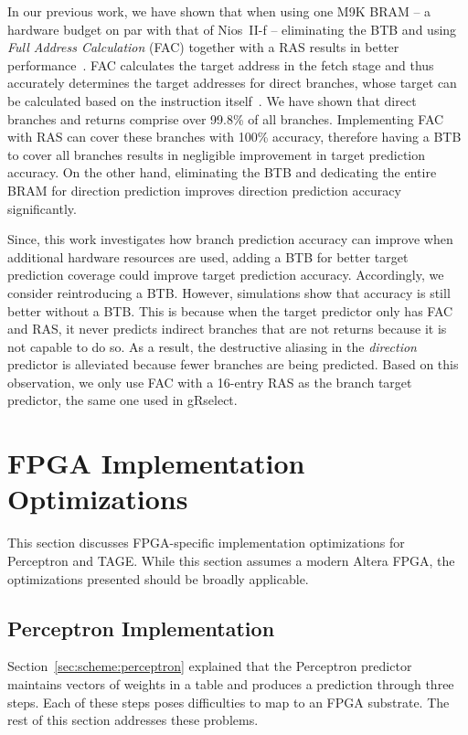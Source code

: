 \documentclass[conference]{IEEEtran}
\begin{document}
In our previous work, we have shown that when using one M9K BRAM -- a hardware budget on par with that of \mbox{Nios~II-f} -- eliminating the BTB and using \textit{Full Address Calculation} (FAC) together with a RAS results in better performance~\cite{grselect}. FAC calculates the target address in the fetch stage and thus accurately determines the target addresses for direct branches, whose target can be calculated based on the instruction itself~\cite{niosii}. We have shown that direct branches and returns comprise over 99.8\% of all branches. Implementing FAC with RAS can cover these branches with 100\% accuracy, therefore having a BTB to cover all branches results in negligible improvement in target prediction accuracy. On the other hand, eliminating the BTB and dedicating the entire BRAM for direction prediction improves direction prediction accuracy significantly.

Since, this work investigates how branch prediction accuracy can improve when additional hardware resources are used,  adding a BTB for better target prediction coverage could improve target prediction accuracy. Accordingly, we consider reintroducing a BTB. However, simulations show that accuracy is still better without a BTB. This is because when the target predictor only has FAC and RAS, it never predicts indirect branches that are not returns because it is not capable to do so. As a result, the destructive aliasing in the \textit{direction} predictor is alleviated because fewer branches are being predicted. Based on this observation, we only use FAC with a 16-entry RAS as the branch target predictor, the same one used in gRselect.


\section{FPGA Implementation Optimizations}
\label{sec:fpga}
This section discusses FPGA-specific implementation optimizations for Perceptron and TAGE. While this section assumes a modern Altera FPGA, the optimizations presented should be broadly applicable.

\subsection{Perceptron Implementation}
\label{sec:fpga:perceptron}

Section~\ref{sec:scheme:perceptron} explained that the Perceptron predictor maintains vectors of weights in a table and produces a prediction through three steps. Each of these steps poses difficulties to map to an FPGA substrate. The rest of this section addresses these problems.
\end{document}
